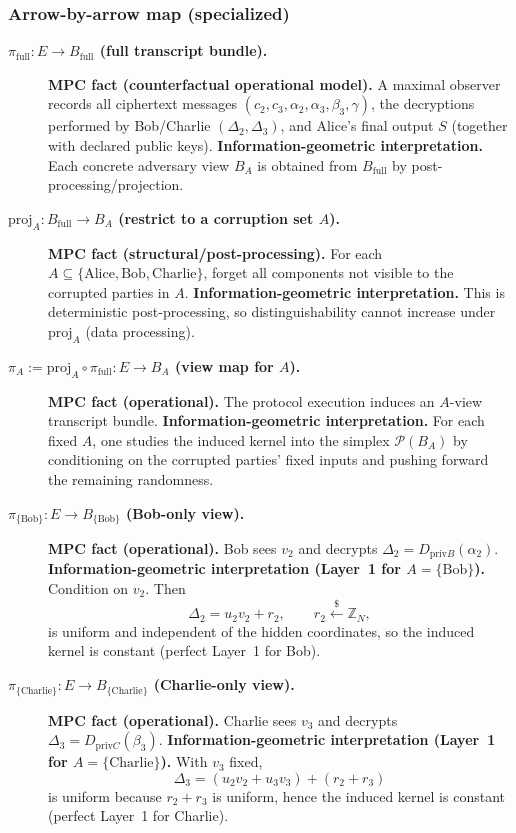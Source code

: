 \documentclass[11pt,a4paper]{article}
\theoremstyle{definition}
\theoremstyle{plain}
\newcommand{\Z}{\mathbb{Z}}
\newcommand{\Prob}{\mathcal{P}}
\begin{document}
\subsubsection{Arrow-by-arrow map (specialized)}
\begin{description}
    \item[\textbf{$\pi_{\mathrm{full}}:E\to B_{\mathrm{full}}$ (full transcript bundle).}]
    \textbf{MPC fact (counterfactual operational model).} A maximal observer records all ciphertext messages $(c_2,c_3,\alpha_2,\alpha_3,\beta_3,\gamma)$, the decryptions performed by Bob/Charlie $(\Delta_2,\Delta_3)$, and Alice's final output $S$ (together with declared public keys).
    \textbf{Information-geometric interpretation.} Each concrete adversary view $B_A$ is obtained from $B_{\mathrm{full}}$ by post-processing/projection.

    \item[\textbf{$\mathrm{proj}_{A}:B_{\mathrm{full}}\to B_{A}$ (restrict to a corruption set $A$).}]
    \textbf{MPC fact (structural/post-processing).} For each $A\subseteq\{\mathrm{Alice},\mathrm{Bob},\mathrm{Charlie}\}$, forget all components not visible to the corrupted parties in $A$.
    \textbf{Information-geometric interpretation.} This is deterministic post-processing, so distinguishability cannot increase under $\mathrm{proj}_A$ (data processing).

    \item[\textbf{$\pi_{A}:=\mathrm{proj}_{A}\circ \pi_{\mathrm{full}}:E\to B_{A}$ (view map for $A$).}]
    \textbf{MPC fact (operational).} The protocol execution induces an $A$-view transcript bundle.
    \textbf{Information-geometric interpretation.} For each fixed $A$, one studies the induced kernel into the simplex $\Prob(B_A)$ by conditioning on the corrupted parties' fixed inputs and pushing forward the remaining randomness.

    \item[\textbf{$\pi_{\{\mathrm{Bob}\}}:E\to B_{\{\mathrm{Bob}\}}$ (Bob-only view).}]
    \textbf{MPC fact (operational).} Bob sees $v_2$ and decrypts $\Delta_2=D_{\mathrm{priv}B}(\alpha_2)$.
    \textbf{Information-geometric interpretation (Layer~1 for $A=\{\mathrm{Bob}\}$).}
    Condition on $v_2$. Then
    \[
    \Delta_2=u_2v_2+r_2,\qquad r_2\xleftarrow{\$}\Z_N,
    \]
    is uniform and independent of the hidden coordinates, so the induced kernel is constant (perfect Layer~1 for Bob).

    \item[\textbf{$\pi_{\{\mathrm{Charlie}\}}:E\to B_{\{\mathrm{Charlie}\}}$ (Charlie-only view).}]
    \textbf{MPC fact (operational).} Charlie sees $v_3$ and decrypts $\Delta_3=D_{\mathrm{priv}C}(\beta_3)$.
    \textbf{Information-geometric interpretation (Layer~1 for $A=\{\mathrm{Charlie}\}$).}
    With $v_3$ fixed,
    \[
    \Delta_3=(u_2v_2+u_3v_3)+(r_2+r_3)
    \]
    is uniform because $r_2+r_3$ is uniform, hence the induced kernel is constant (perfect Layer~1 for Charlie).


\end{description}
\end{document}
